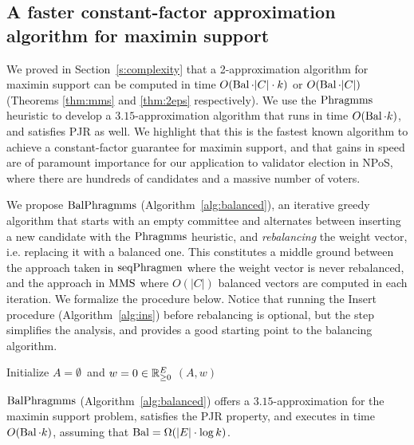 \subsection{A faster constant-factor approximation algorithm for maximin support}\label{s:315}

We proved in Section~\ref{s:complexity} that a 2-approximation algorithm for maximin support can be computed in time $O(\operatorname{Bal}\cdot |C|\cdot k)$ or $O(\operatorname{Bal}\cdot |C|)$ (Theorems \ref{thm:mms} and \ref{thm:2eps} respectively). 
We use the $\operatorname{Phragmms}$ heuristic to develop a $3.15$-approximation algorithm that runs in time $O(\operatorname{Bal}\cdot k)$, and satisfies PJR as well. 
We highlight that this is the fastest known algorithm to achieve a constant-factor guarantee for maximin support, and that gains in speed are of paramount importance for our application to validator election in NPoS, where there are hundreds of candidates and a massive number of voters.

We propose $\balanced$ (Algorithm~\ref{alg:balanced}), an iterative greedy algorithm that starts with an empty committee and alternates between inserting a new candidate with the $\operatorname{Phragmms}$ heuristic, and \emph{rebalancing} the weight vector, i.e. replacing it with a balanced one. This constitutes a middle ground between the approach taken in $\operatorname{seqPhragmen}$ where the weight vector is never rebalanced, and the approach in $\operatorname{MMS}$ where $O(|C|)$ balanced vectors are computed in each iteration. 
We formalize the procedure below. Notice that running the Insert procedure (Algorithm~\ref{alg:ins}) before rebalancing is optional, but the step simplifies the analysis, and provides a good starting point to the balancing algorithm.

\begin{algorithm}[htb]\label{alg:balanced}
\SetAlgoLined
{}
Initialize $A=\emptyset$\ and $w=0\in\mathbb{R}_{\geq 0}^E$\;
\Return $(A,w)$\;
\caption{$\balanced$}
\end{algorithm}

\begin{theorem}\label{thm:315}
$\balanced$ (Algorithm~\ref{alg:balanced}) offers a $3.15$-approximation for the maximin support problem, satisfies the PJR property, and executes in time $O(\operatorname{Bal}\cdot k)$, assuming that $\operatorname{Bal}= \Omega(|E|\cdot \log k)$.
\end{theorem}

